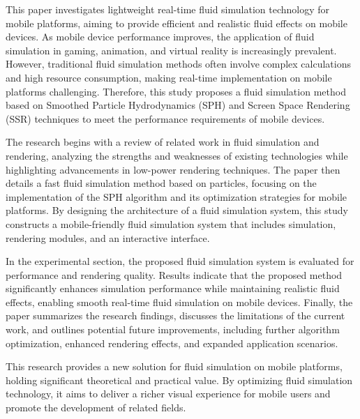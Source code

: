 \documentclass[printMode=false, declarePage=true]{ecnuthesis}
\begin{document}
\begin{abstractEN}
  This paper investigates lightweight real-time fluid simulation technology for mobile platforms, aiming to provide efficient and realistic fluid effects on mobile devices. As mobile device performance improves, the application of fluid simulation in gaming, animation, and virtual reality is increasingly prevalent. However, traditional fluid simulation methods often involve complex calculations and high resource consumption, making real-time implementation on mobile platforms challenging. Therefore, this study proposes a fluid simulation method based on Smoothed Particle Hydrodynamics (SPH) and Screen Space Rendering (SSR) techniques to meet the performance requirements of mobile devices.
  
  The research begins with a review of related work in fluid simulation and rendering, analyzing the strengths and weaknesses of existing technologies while highlighting advancements in low-power rendering techniques. The paper then details a fast fluid simulation method based on particles, focusing on the implementation of the SPH algorithm and its optimization strategies for mobile platforms. By designing the architecture of a fluid simulation system, this study constructs a mobile-friendly fluid simulation system that includes simulation, rendering modules, and an interactive interface.
  
  In the experimental section, the proposed fluid simulation system is evaluated for performance and rendering quality. Results indicate that the proposed method significantly enhances simulation performance while maintaining realistic fluid effects, enabling smooth real-time fluid simulation on mobile devices. Finally, the paper summarizes the research findings, discusses the limitations of the current work, and outlines potential future improvements, including further algorithm optimization, enhanced rendering effects, and expanded application scenarios.
  
  This research provides a new solution for fluid simulation on mobile platforms, holding significant theoretical and practical value. By optimizing fluid simulation technology, it aims to deliver a richer visual experience for mobile users and promote the development of related fields.
\end{abstractEN}




\mainmatter

% 
% 
\end{document}
